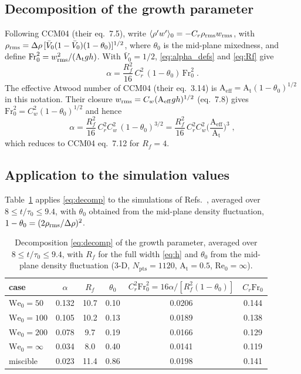 \documentclass[11pt]{article}
\numberwithin{equation}{section}
\newcommand{\avg}[1]{\langle #1\rangle}
\newcommand{\At}{\mathrm{A_t}}
\newcommand{\We}{\mathrm{We}_0}
\begin{document}
\subsection{Decomposition of the growth parameter}\label{sec:cook:decomp}
Following CCM04 (their eq.~7.5), write $\avg{\rho' w'}_0 = -C_r \rho_{\rm rms} w_{\rm rms}$, with $\rho_{\rm rms} = \Delta \rho \,[\bar V_0(1 - \bar V_0)(1 - \theta_0)]^{1/2}$, where $\theta_0$ is the mid-plane mixedness, and define $\mathrm{Fr}_0^2 = w_{\rm rms}^2/(\At g h)$. With $\bar V_0 = 1/2$, \eqref{eq:alpha_defs} and \eqref{eq:Rf} give
\begin{equation}\label{eq:decomp}
\alpha = \frac{R_f^2}{16} \, C_r^2 \,(1 - \theta_0) \, \mathrm{Fr}_0^2 \;.
\end{equation}
The effective Atwood number of CCM04 (their eq.~3.14) is $\mathrm{A}_\mathrm{eff} = \At(1 - \theta_0)^{1/2}$ in this notation. Their closure $w_{\rm rms} = C_w(\mathrm{A}_\mathrm{eff} g h)^{1/2}$ (eq.~7.8) gives $\mathrm{Fr}_0^2 = C_w^2(1 - \theta_0)^{1/2}$ and hence
\begin{equation}\label{eq:cook_closure}
\alpha = \frac{R_f^2}{16} \, C_r^2 C_w^2 \,(1 - \theta_0)^{3/2} = \frac{R_f^2}{16} \, C_r^2 C_w^2 \Big(\frac{\mathrm{A}_\mathrm{eff}}{\At}\Big)^3 \;,
\end{equation}
which reduces to CCM04 eq.~7.12 for $R_f = 4$.

\subsection{Application to the simulation values}\label{sec:cook:table}
Table~\ref{tab:decomp} applies \eqref{eq:decomp} to the simulations of Refs.~\cite{Walker2026,Walker2027_1,Walker2027_2}, averaged over $8 \le t/\tau_0 \le 9.4$, with $\theta_0$ obtained from the mid-plane density fluctuation, $1 - \theta_0 = (2 \rho_{\rm rms}/\Delta \rho)^2$.
\begin{table}[h!]
\centering
\caption{Decomposition \eqref{eq:decomp} of the growth parameter, averaged over $8 \le t/\tau_0 \le 9.4$, with $R_f$ for the full width \eqref{eq:h} and $\theta_0$ from the mid-plane density fluctuation (3-D, $N_\mathrm{pts} = 1120$, $\At = 0.5$, $\mathrm{Re}_0 = \infty$).}
\label{tab:decomp}
\begin{tabular}{lccccc}
\toprule
case & $\alpha$ & $R_f$ & $\theta_0$ & $C_r^2 \mathrm{Fr}_0^2 = 16 \alpha/[R_f^2(1 - \theta_0)]$ & $C_r \mathrm{Fr}_0$\\
\midrule
$\We = 50$ & 0.132 & 10.7 & 0.10 & 0.0206 & 0.144\\
$\We = 100$ & 0.105 & 10.2 & 0.13 & 0.0189 & 0.138\\
$\We = 200$ & 0.078 & 9.7 & 0.19 & 0.0166 & 0.129\\
$\We = \infty$ & 0.034 & 8.0 & 0.40 & 0.0141 & 0.119\\
miscible & 0.023 & 11.4 & 0.86 & 0.0198 & 0.141\\
\bottomrule
\end{tabular}
\end{table}
\end{document}
